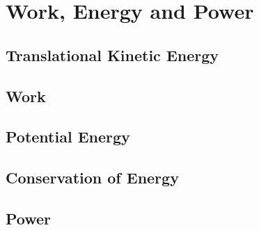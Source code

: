 \documentclass[../mech.tex]{subfiles}
\begin{document}
\chapter{Work, Energy and Power}
\section{Translational Kinetic Energy}
\section{Work}
\section{Potential Energy}
\section{Conservation of Energy}
\section{Power}
\end{document}

